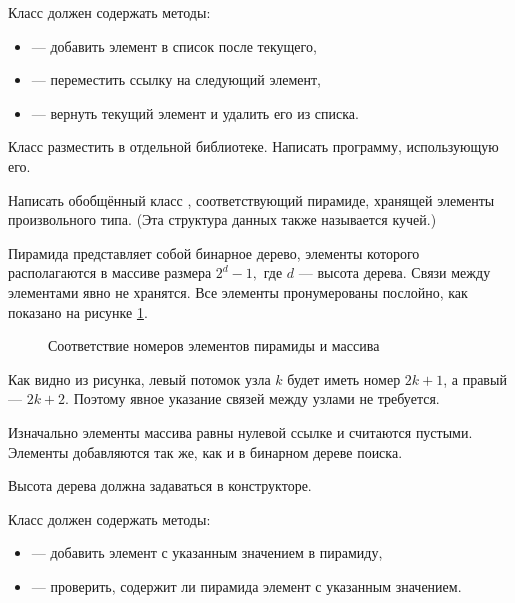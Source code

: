 Класс должен содержать методы:
\begin{itemize}
\item {} — добавить элемент в список после текущего,
\item {} — переместить ссылку на следующий элемент,
\item {} — вернуть текущий элемент и удалить его из списка.
\end{itemize}

Класс разместить в отдельной библиотеке. Написать программу,
использующую его.

\task Написать обобщённый класс , соответствующий пирамиде,
хранящей элементы произвольного типа. (Эта структура данных также
называется кучей.)

Пирамида представляет собой бинарное дерево, элементы которого
располагаются в массиве размера $2^d-1,$ где $d$ — высота
дерева. Связи между элементами явно не хранятся. Все элементы
пронумерованы послойно, как показано на рисунке \ref{fig:heap}.

\begin{figure}
  \centering

  \caption{Соответствие номеров элементов пирамиды и массива\label{fig:heap}}
\end{figure}

Как видно из рисунка, левый потомок узла $k$ будет иметь номер $2k+1$,
а правый — $2k+2.$ Поэтому явное указание связей между узлами не требуется.

Изначально элементы массива равны нулевой ссылке и считаются
пустыми. Элементы добавляются так же, как и в бинарном дереве поиска.

Высота дерева должна задаваться в конструкторе.

Класс должен содержать методы:
\begin{itemize}
\item {} — добавить элемент с указанным значением в пирамиду,
\item {} — проверить, содержит ли пирамида элемент с указанным
  значением.
\end{itemize}

